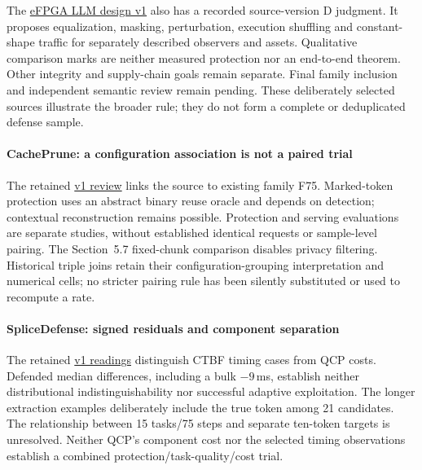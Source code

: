 The \href{https://arxiv.org/html/2604.22935v1}{eFPGA LLM design v1} also has a recorded source-version D judgment. It proposes equalization, masking, perturbation, execution shuffling and constant-shape traffic for separately described observers and assets. Qualitative comparison marks are neither measured protection nor an end-to-end theorem. Other integrity and supply-chain goals remain separate. Final family inclusion and independent semantic review remain pending. These deliberately selected sources illustrate the broader rule; they do not form a complete or deduplicated defense sample.

\paragraph{CachePrune: a configuration association is not a paired trial}
The retained \href{https://arxiv.org/html/2605.23640v1}{v1 review} links the source to existing family F75. Marked-token protection uses an abstract binary reuse oracle and depends on detection; contextual reconstruction remains possible. Protection and serving evaluations are separate studies, without established identical requests or sample-level pairing. The Section~5.7 fixed-chunk comparison disables privacy filtering. Historical triple joins retain their configuration-grouping interpretation and numerical cells; no stricter pairing rule has been silently substituted or used to recompute a rate.

\paragraph{SpliceDefense: signed residuals and component separation}
The retained \href{https://arxiv.org/html/2606.21842v1}{v1 readings} distinguish CTBF timing cases from QCP costs. Defended median differences, including a bulk $-9$\,ms, establish neither distributional indistinguishability nor successful adaptive exploitation. The longer extraction examples deliberately include the true token among 21 candidates. The relationship between 15 tasks/75 steps and separate ten-token targets is unresolved. Neither QCP's component cost nor the selected timing observations establish a combined protection/task-quality/cost trial.

